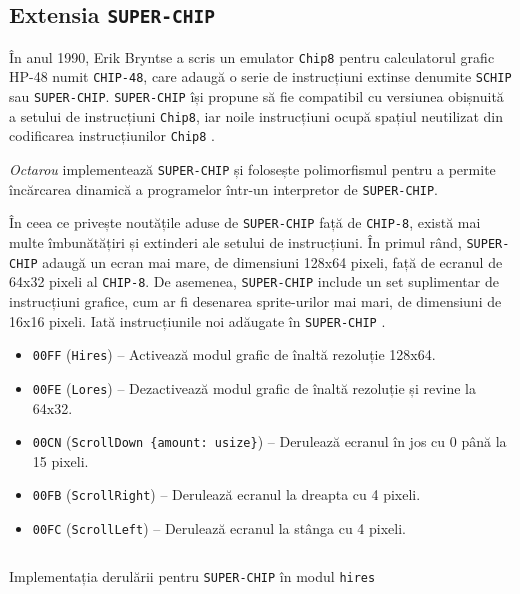 \documentclass[a4paper]{article}
\begin{document}
\subsection{Extensia \texttt{SUPER-CHIP}}
În anul 1990, Erik Bryntse a scris un emulator \texttt{Chip8} pentru calculatorul grafic HP-48 numit \texttt{CHIP-48}, care adaugă o serie
de instrucțiuni extinse denumite \texttt{SCHIP} sau \texttt{SUPER-CHIP}. \texttt{SUPER-CHIP} își propune să fie compatibil cu versiunea obișnuită
a setului de instrucțiuni \texttt{Chip8}, iar noile instrucțiuni ocupă spațiul neutilizat din codificarea instrucțiunilor \texttt{Chip8} \cite{bryntse}.

\textit{Octarou} implementează \texttt{SUPER-CHIP} și folosește polimorfismul pentru a permite încărcarea dinamică a programelor într-un interpretor
de \texttt{SUPER-CHIP}.

În ceea ce privește noutățile aduse de \texttt{SUPER-CHIP} față de \texttt{CHIP-8}, există mai multe îmbunătățiri și extinderi ale setului de instrucțiuni.
În primul rând, \texttt{SUPER-CHIP} adaugă un ecran mai mare, de dimensiuni 128x64 pixeli, față de ecranul de 64x32 pixeli al \texttt{CHIP-8}. De asemenea,
\texttt{SUPER-CHIP} include un set suplimentar de instrucțiuni grafice, cum ar fi desenarea sprite-urilor mai mari, de dimensiuni de 16x16 pixeli.
Iată instrucțiunile noi adăugate în \texttt{SUPER-CHIP} \cite{chip8research}.

\begin{itemize}
	\item \texttt{00FF} (\verb|Hires|) -- Activează modul grafic de înaltă rezoluție 128x64.
	\item \texttt{00FE} (\verb|Lores|) -- Dezactivează modul grafic de înaltă rezoluție și revine la 64x32.
	\item \texttt{00CN} (\verb|ScrollDown {amount: usize}|) -- Derulează ecranul în jos cu 0 până la 15 pixeli.
	\item \texttt{00FB} (\verb|ScrollRight|) -- Derulează ecranul la dreapta cu 4 pixeli.
	\item \texttt{00FC} (\verb|ScrollLeft|) -- Derulează ecranul la stânga cu 4 pixeli.
\end{itemize}

\begin{listing}
	\begin{center}
		\inputminted{rust}{codeblocks/scroll.rs}
		\caption{Implementația derulării pentru \texttt{SUPER-CHIP} în modul \texttt{hires}}
	\end{center}
\end{listing}
\end{document}
